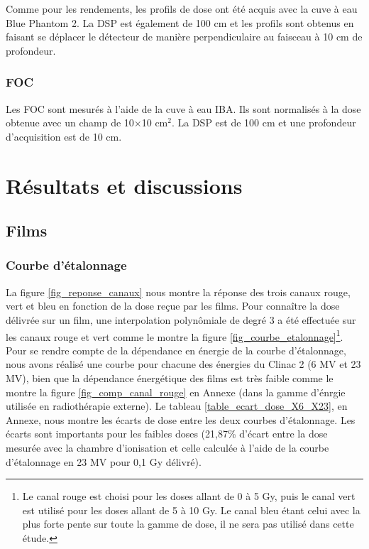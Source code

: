 \documentclass{book}
\begin{document}
Comme pour les rendements, les profils de dose ont été acquis avec la cuve à eau Blue Phantom 2. La DSP est également de 100 cm et les profils sont obtenus en faisant se déplacer le détecteur de manière perpendiculaire au faisceau à 10 cm de profondeur.

\subsection{FOC}

Les FOC sont mesurés à l'aide de la cuve à eau IBA. Ils sont normalisés à la dose obtenue avec un champ de 10$\times$10 cm$^2$. La DSP est de 100 cm et une profondeur d'acquisition est de 10 cm.


\chapter{Résultats et discussions}
\section{Films}
\subsection{Courbe d'étalonnage}

La figure \ref*{fig_reponse_canaux} nous montre la réponse des trois canaux rouge, vert et bleu en fonction de la dose reçue par les films. Pour connaître la dose délivrée sur un film, une interpolation polynômiale de degré 3 a été effectuée sur les canaux rouge et vert comme le montre la figure \ref*{fig_courbe_etalonnage}\footnote{Le canal rouge est choisi pour les doses allant de 0 à 5 Gy, puis le canal vert est utilisé pour les doses allant de 5 à 10 Gy. Le canal bleu étant celui avec la plus forte pente sur toute la gamme de dose, il ne sera pas utilisé dans cette étude.}. Pour se rendre compte de la dépendance en énergie de la courbe d'étalonnage, nous avons réalisé une courbe pour chacune des énergies du Clinac 2 (6 MV et 23 MV), bien que la dépendance énergétique des films est très faible comme le montre la figure \ref*{fig_comp_canal_rouge} en Annexe (dans la gamme d'énrgie utilisée en radiothérapie externe). Le tableau \ref*{table_ecart_dose_X6_X23}, en Annexe, nous montre les écarts de dose entre les deux courbes d'étalonnage. Les écarts sont importants pour les faibles doses (21,87\% d'écart entre la dose mesurée avec la chambre d'ionisation et celle calculée à l'aide de la courbe d'étalonnage en 23 MV pour 0,1 Gy délivré).
\end{document}
